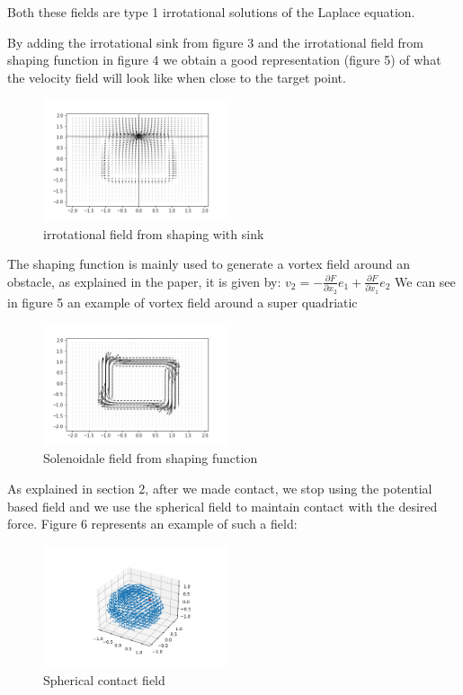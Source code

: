 Both these fields are type 1 irrotational solutions of the Laplace equation.

By adding the irrotational sink from figure 3 and the irrotational field from shaping function in figure 4 we obtain a good representation (figure 5) of what the velocity field will look like when close to the target point. 
\begin{figure}[h!]
    \centering
    \includegraphics[width=0.48\textwidth]{Images/irrotashapingwithsink.png}
    \caption{irrotational field from shaping with sink}
    \label{fig:irrotafromshapingwithsink}
\end{figure}

The shaping function is mainly used to generate a vortex field around an obstacle, as explained in the paper, it is given by: 
$v_2=-\frac{\partial{F}}{\partial{x_2}}e_1 + \frac{\partial{F}}{\partial{x_1}}e_2 $
We can see in figure 5 an example of vortex field around a super quadriatic
\begin{figure}[h!]
    \centering
    \includegraphics[width=0.48\textwidth]{Images/rotafromshaping.png}
    \caption{Solenoidale field from shaping function}
    \label{fig:rotafromshaping}
\end{figure}

As explained in section 2, after we made contact, we stop using the potential based field and we use the spherical field to maintain 
contact with the desired force. 
Figure 6 represents an example of such a field: 
\begin{figure}[h!]
    \centering
    \includegraphics[width=0.48\textwidth]{Images/sphericalfield.png}
    \caption{Spherical contact field}
    \label{fig:spherical}
\end{figure}
